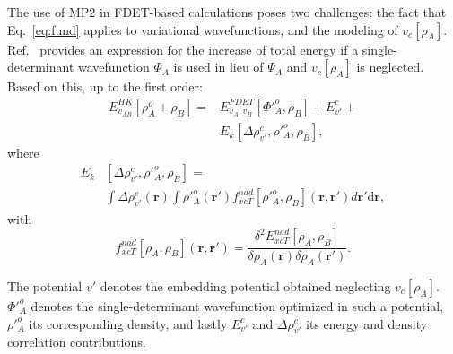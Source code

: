 \documentclass[journal=jctcce,manuscript=article, layout=twocolumn]{achemso}
\begin{document}
The use of MP2 in FDET-based calculations poses two challenges: the fact that Eq.~\ref{eq:fund} applies to variational wavefunctions, and the modeling of $v_c[\rho_A]$. Ref.~ provides an expression for the increase of total energy if a single-determinant wavefunction $\Phi_A$ is used in lieu of $\Psi_A$ and $v_c[\rho_A]$ is neglected. Based on this, up to the first order:
\begin{align} \label{eq:E_FDET_novc}
 E_{v_{AB}}^{HK}[\rho_A^{o}+\rho_B] =  & E_{v_A,v_B}^{FDET}[\Phi'^{o}_{A},\rho_B] + E^c_{v'} + \\ \nonumber
 & E_k[\Delta \rho^c_{v'}, \rho'^{o}_A, \rho_B],
\end{align}
where
\begin{align} \label{eq:kernel}
 E_k & [\Delta \rho^c_{v'}, \rho'^{o}_A, \rho_B] = \\ \nonumber
 & \int \Delta \rho^c_{v'}(\mathbf{r}) \int \rho'^{o}_A(\mathbf{r'})f^{nad}_{xcT}[\rho'^{o}_A, \rho_B](\mathbf{r},\mathbf{r'})d\mathbf{r'}\mathrm{d}\mathbf{r},
\end{align}
with
\begin{equation} \label{eq:f_nad}
 f^{nad}_{xcT}[\rho_A, \rho_B](\mathbf{r},\mathbf{r'}) = \frac{\delta^2 E^{nad}_{xcT}[\rho_A, \rho_B]}{\delta \rho_A(\mathbf{r}) \delta \rho_A(\mathbf{r'})}.
\end{equation}

The potential $v'$ denotes the embedding potential obtained neglecting $v_c[\rho_A]$. $\Phi'^{o}_A$ denotes the single-determinant wavefunction optimized in such a potential, $\rho'^{o}_A$ its corresponding density, and lastly $E^c_{v'}$ and $\Delta \rho^c_{v'}$ its energy and density correlation contributions.
\end{document}
